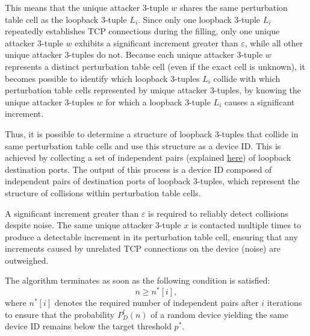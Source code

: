 \documentclass{report}
\begin{document}
This means that the unique attacker 3-tuple \(w\) shares the same perturbation table cell as the loopback 3-tuple \(L_i\). Since \alert{only one} loopback 3-tuple \(L_i\) repeatedly establishes TCP connections during the filling, only one unique attacker 3-tuple \(w\) exhibits a \alert{significant increment} greater than \(\varepsilon\), while all other unique attacker 3-tuples do not. Because each unique attacker 3-tuple \(w\) represents a distinct perturbation table cell (even if the exact cell is unknown), it becomes possible to identify which loopback 3-tuples \(L_i\) collide with which perturbation table cells represented by unique attacker 3-tuples, by knowing the unique attacker 3-tuples \(w\) for which a loopback 3-tuple \(L_i\) causes a significant increment.

Thus, it is possible to determine a \alert{structure} of loopback 3-tuples that collide in same perturbation table cells and use this structure as a \alert{device ID}. This is achieved by collecting a set of \alert{independent pairs} (explained \hyperlink{independant}{here}) of loopback destination ports. The \alert{output} of this process is a device ID composed of independent pairs of destination ports of loopback 3-tuples, which represent the structure of collisions within perturbation table cells.

A significant increment greater than \(\varepsilon\) is required to reliably detect collisions despite \alert{noise}. The same unique attacker 3-tuple \(x\) is contacted \alert{multiple times} to produce a detectable increment in its perturbation table cell, ensuring that any increments caused by unrelated TCP connections on the device (noise) are outweighed.

%

The algorithm \alert{terminates} as soon as the following condition is satisfied:
\[
  n \ge n^*[i],
\]
where \( n^*[i] \) denotes the required \alert{number of independent pairs} after \( i \) \alert{iterations} to ensure that the \alert{probability} \( P^l_D(n) \) of a random device yielding the same device ID remains below the target threshold \( p^* \).
\end{document}

